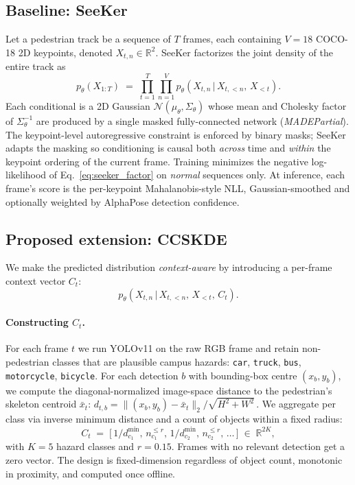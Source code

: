 \documentclass{article}
\begin{document}
\subsection{Baseline: SeeKer}
\label{ssec:baseline}
Let a pedestrian track be a sequence of $T$ frames, each containing $V=18$
COCO-18 2D keypoints, denoted $X_{t,n} \in \mathbb{R}^{2}$. SeeKer
factorizes the joint density of the entire track as
\begin{equation}
\label{eq:seeker_factor}
p_{\theta}\!\left(X_{1:T}\right) \;=\;
\prod_{t=1}^{T} \prod_{n=1}^{V}
p_{\theta}\!\left(X_{t,n}\,\big|\, X_{t,<n},\, X_{<t}\right).
\end{equation}
Each conditional is a 2D Gaussian
$\mathcal{N}(\mu_{\theta}, \Sigma_{\theta})$ whose mean and Cholesky factor
of $\Sigma_{\theta}^{-1}$ are produced by a single masked fully-connected
network (\emph{MADEPartial}). The keypoint-level autoregressive constraint
is enforced by binary masks; SeeKer adapts the masking so conditioning is
causal both \emph{across} time and \emph{within} the keypoint ordering of
the current frame. Training minimizes the negative log-likelihood of
Eq.~\ref{eq:seeker_factor} on \emph{normal} sequences only. At inference,
each frame's score is the per-keypoint Mahalanobis-style NLL,
Gaussian-smoothed and optionally weighted by AlphaPose detection
confidence.

\subsection{Proposed extension: CCSKDE}
\label{ssec:ccskde}
We make the predicted distribution \emph{context-aware} by introducing a
per-frame context vector $C_t$:
\begin{equation}
\label{eq:ccskde_factor}
p_{\theta}\!\left(X_{t,n}\,\big|\, X_{t,<n},\, X_{<t},\, C_t\right).
\end{equation}

\paragraph{Constructing $C_t$.}
For each frame $t$ we run YOLOv11 on the raw RGB frame and retain
non-pedestrian classes that are plausible campus hazards: \texttt{car},
\texttt{truck}, \texttt{bus}, \texttt{motorcycle}, \texttt{bicycle}. For each
detection $b$ with bounding-box centre $(x_b, y_b)$, we compute the
diagonal-normalized image-space distance to the pedestrian's skeleton
centroid $\bar{x}_t$:
\(
d_{t,b} = \lVert (x_b, y_b) - \bar{x}_t \rVert_2 / \sqrt{H^2 + W^2}\,.
\)
We aggregate per class via inverse minimum distance and a count of objects
within a fixed radius:
\begin{equation}
C_t \;=\; \big[\,1/d^{\min}_{c_1},\,n^{\le r}_{c_1},\,
                 1/d^{\min}_{c_2},\,n^{\le r}_{c_2},\,\dots\,\big]
\;\in\;\mathbb{R}^{2K},
\end{equation}
with $K=5$ hazard classes and $r=0.15$. Frames with no relevant detection
get a zero vector. The design is fixed-dimension regardless of object
count, monotonic in proximity, and computed once offline.
\end{document}
